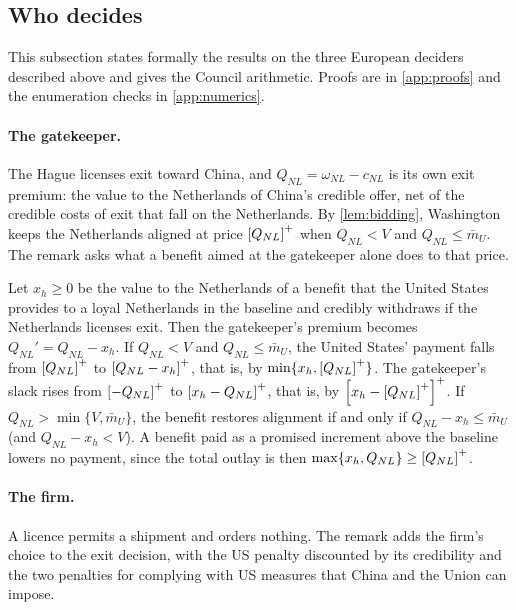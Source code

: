\subsection{Who decides}\label{app:decide}

This subsection states formally the results on the three European deciders described above and gives the Council arithmetic. Proofs are in \cref{app:proofs} and the enumeration checks in \cref{app:numerics}.

\paragraph{The gatekeeper.} The Hague licenses exit toward China, and $Q_{NL}=\omega_{NL}-c_{NL}$ is its own exit premium: the value to the Netherlands of China's credible offer, net of the credible costs of exit that fall on the Netherlands. By \cref{lem:bidding}, Washington keeps the Netherlands aligned at price $\left[Q_{NL}\right]^{+}$ when $Q_{NL}<V$ and $Q_{NL}\le\bar m_U$. The remark asks what a benefit aimed at the gatekeeper alone does to that price.

\begin{remark}[Gatekeeper]\label{rem:gatekeeper}
Let $x_h\ge0$ be the value to the Netherlands of a benefit that the United States provides to a loyal Netherlands in the baseline and credibly withdraws if the Netherlands licenses exit. Then the gatekeeper's premium becomes $Q_{NL}'=Q_{NL}-x_h$. If $Q_{NL}<V$ and $Q_{NL}\le\bar m_U$, the United States' payment falls from $\left[Q_{NL}\right]^{+}$ to $\left[Q_{NL}-x_h\right]^{+}$, that is, by $\min\{x_h,\left[Q_{NL}\right]^{+}\}$. The gatekeeper's slack rises from $\left[-Q_{NL}\right]^{+}$ to $\left[x_h-Q_{NL}\right]^{+}$, that is, by $\left[x_h-\left[Q_{NL}\right]^{+}\right]^{+}$. If $Q_{NL}>\min\{V,\bar m_U\}$, the benefit restores alignment if and only if $Q_{NL}-x_h\le\bar m_U$ (and $Q_{NL}-x_h<V$). A benefit paid as a promised increment above the baseline lowers no payment, since the total outlay is then $\max\{x_h,Q_{NL}\}\ge\left[Q_{NL}\right]^{+}$.
\end{remark}

\paragraph{The firm.} A licence permits a shipment and orders nothing. The remark adds the firm's choice to the exit decision, with the US penalty discounted by its credibility and the two penalties for complying with US measures that China and the Union can impose.

